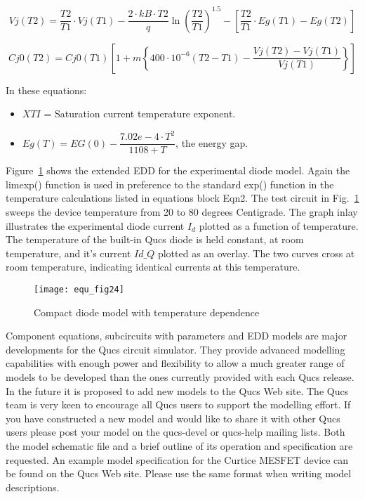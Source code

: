\begin{equation}
 Vj (T2) = \dfrac{T2}{T1}\cdot Vj(T1) - \dfrac{2 \cdot kB \cdot T2}{q} \ln\left( \dfrac{T2}{T1}\right) ^{1.5} - \left[ \dfrac{T2}{T1}\cdot Eg(T1) - Eg(T2)\right]  
\end{equation} 

\begin{equation}
 Cj0 (T2) = Cj0 (T1)  \left[ 1+m  \left\lbrace 400\cdot 10^{-6}  \left( T2-T1\right) - \dfrac{Vj(T2)-Vj(T1)}{Vj(T1)} \right\rbrace \right]
\end{equation} 

In these equations:
\begin{itemize}
 \item $XTI$ = Saturation current temperature exponent.
 \item $Eg(T) = EG(0)-\dfrac{7.02e-4 \cdot T^{2}}{1108+T}$, the energy gap. 
\end{itemize}

Figure~\ref{fig:equ_24} shows the extended EDD for the experimental
diode model. Again the limexp() function is used in preference to the
standard exp() function in the temperature calculations listed in
equations block Eqn2. The test circuit in Fig.~\ref{fig:equ_24} sweeps
the device temperature from 20 to 80 degrees Centigrade. The graph
inlay illustrates the experimental diode current $I_{d}$ plotted as a
function of temperature. The temperature of the built-in Qucs diode is
held constant, at room temperature, and it's current $Id\_Q$ plotted as 
an overlay. The two curves cross at room temperature, indicating
identical currents at this temperature.



\begin{figure} 
  \centering
  \texttt{[image: equ\_fig24]}
  \caption{Compact diode model with temperature dependence}  
  \label{fig:equ_24}
\end{figure} 


Component equations, subcircuits with parameters and EDD models are
major developments for the Qucs circuit simulator. They provide
advanced modelling capabilities with enough power and flexibility to
allow a much greater range of models to be developed than the ones
currently provided with each Qucs release. In the future it is
proposed to add new models to the Qucs Web site. The Qucs team is very
keen to encourage all Qucs users to support the modelling effort. If
you have constructed a new model and would like to share it with other
Qucs users please post your model on the qucs-devel or qucs-help
mailing lists. Both the model schematic file and a brief outline of
its operation and specification are requested.  An example model
specification for the Curtice MESFET device can be found on the Qucs
Web site. Please use the same format when writing model descriptions.

